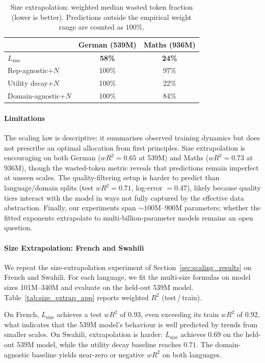 \begin{table}[h]
\centering
\caption{Size extrapolation: weighted median wasted token fraction (lower is better). Predictions outside the empirical weight range are counted as $100\%$.}
\label{tab:size_extrap_wasted}
\small
\begin{tabular}{lcc}
\toprule
& German (539M) & Maths (936M) \\
\midrule
$L_\mathrm{size}$ & \textbf{58\%} & \textbf{24\%} \\
Rep-agnostic+$N$ & 100\% & 97\% \\
Utility decay+$N$ & 100\% & 22\% \\
Domain-agnostic+$N$ & 100\% & 84\% \\
\bottomrule
\end{tabular}
\end{table}


\paragraph{Limitations}
The scaling law is descriptive: it summarises observed training dynamics but does not prescribe an optimal allocation from first principles.
Size extrapolation is encouraging on both German ($wR^2 = 0.65$ at 539M) and Maths ($wR^2 = 0.73$ at 936M), though the wasted-token metric reveals that predictions remain imperfect at unseen scales.
The quality-filtering setup is harder to predict than language/domain splits (test $wR^2 = 0.71$, log-error $= 0.47$), likely because quality tiers interact with the model in ways not fully captured by the effective data abstraction.
Finally, our experiments span ${\sim}100\text{M}$--$900\text{M}$ parameters; whether the fitted exponents extrapolate to multi-billion-parameter models remains an open question.

\paragraph{Size Extrapolation: French and Swahili}
\label{app:size_extrap}

We repeat the size-extrapolation experiment of Section~\ref{sec:scaling_results} on French and Swahili.
For each language, we fit the multi-size formulas on model sizes 101M--340M and evaluate on the held-out 539M model.
Table~\ref{tab:size_extrap_app} reports weighted $R^2$ (test\,/\,train).

On French, $L_\mathrm{size}$ achieves a test $wR^2$ of $0.93$, even exceeding its train $wR^2$ of $0.92$, what indicates that the 539M model's behaviour is well predicted by trends from smaller scales.
On Swahili, extrapolation is harder: $L_\mathrm{size}$ achieves $0.69$ on the held-out 539M model, while the utility decay baseline reaches $0.71$.
The domain-agnostic baseline yields near-zero or negative $wR^2$ on both languages.

